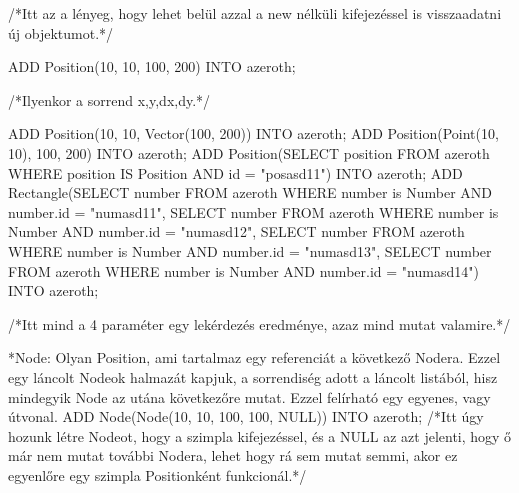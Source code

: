 /*Itt az a lényeg, hogy lehet belül azzal a new nélküli kifejezéssel is visszaadatni új objektumot.*/

\begin{sql}
ADD Position(10, 10, 100, 200) INTO azeroth;
\end{sql}
/*Ilyenkor a sorrend x,y,dx,dy.*/
\begin{sql}
ADD Position(10, 10, Vector(100, 200)) INTO azeroth;
ADD Position(Point(10, 10), 100, 200) INTO azeroth;
ADD Position(SELECT position FROM azeroth WHERE position IS Position AND id = "posasd11") INTO azeroth;
ADD Rectangle(SELECT number FROM azeroth WHERE number is Number AND number.id = "numasd11", SELECT number FROM azeroth WHERE number is Number AND number.id = "numasd12", SELECT number FROM azeroth WHERE number is Number AND number.id = "numasd13", SELECT number FROM azeroth WHERE number is Number AND number.id = "numasd14") INTO azeroth;
\end{sql}

/*Itt mind a 4 paraméter egy lekérdezés eredménye, azaz mind mutat valamire.*/

*Node: Olyan Position, ami tartalmaz egy referenciát a következő Nodera. Ezzel egy láncolt Nodeok halmazát kapjuk, a sorrendiség adott a láncolt listából, hisz mindegyik Node az utána következőre mutat. Ezzel felírható egy egyenes, vagy útvonal. 
ADD Node(Node(10, 10, 100, 100, NULL)) INTO azeroth; /*Itt úgy hozunk létre Nodeot, hogy a szimpla kifejezéssel, és a NULL az azt jelenti, hogy ő már nem mutat további Nodera, lehet hogy rá sem mutat semmi, akor ez egyenlőre egy szimpla Positionként funkcionál.*/


